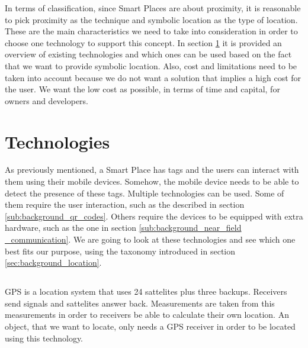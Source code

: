 In terms of classification, since Smart Places are about proximity, it is reasonable to pick proximity as the technique and symbolic location as the type of location.
These are the main characteristics we need to take into consideration in order to choose one technology to support this concept.
In section \ref{sec:background_technologies} it is provided an overview of existing technologies and which ones can be used based on the fact that we want to provide symbolic location.
Also, cost and limitations need to be taken into account because we do not want a solution that implies a high cost for the user.
We want the low cost as possible, in terms of time and capital, for owners and developers.

\section{Technologies}
\label{sec:background_technologies}
As previously mentioned, a Smart Place has tags and the users can interact with them using their mobile devices.
Somehow, the mobile device needs to be able to detect the presence of these tags.
Multiple technologies can be used.
Some of them require the user interaction, such as the described in section \ref{sub:background_qr_codes}.
Others require the devices to be equipped with extra hardware, such as the one in section \ref{sub:background_near_field _communication}.
We are going to look at these technologies and see which one best fits our purpose, using the taxonomy introduced in section \ref{sec:background_location}.

\subsection{}
\label{sub:background_gps}
\gls{GPS} is a location system that uses 24 sattelites plus three backups.
Receivers send signals and sattelites answer back. Measurements are taken from this measurements in order to receivers be able to calculate their own location.
An object, that we want to locate, only needs a \gls{GPS} receiver in order to be located using this technology.

